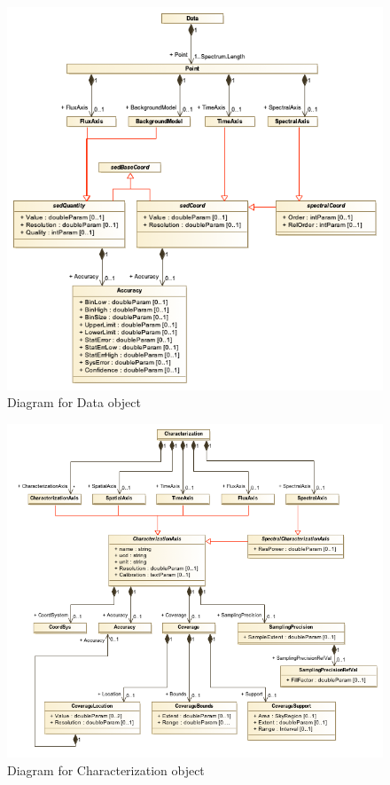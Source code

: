 \documentclass[11pt]{article}
\begin{document}
\begin{figure}[h]
  \begin{center}
    \includegraphics[width=5.0in]{diagrams/data.png}
    \caption{Diagram for Data object}
  \end{center}
\end{figure}

\begin{figure}[h]
  \begin{center}
  \includegraphics[width=6.0in]{diagrams/characterization.png}
  \caption{Diagram for Characterization object}
  \end{center}
\end{figure}
\end{document}

